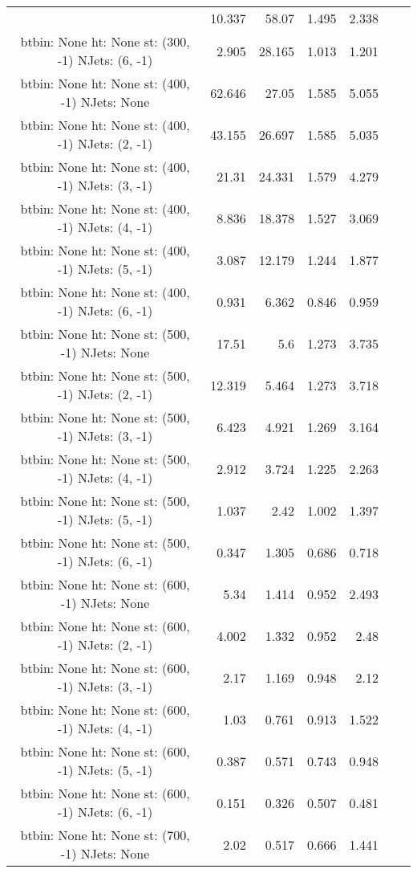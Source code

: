 \documentclass[12pt]{paper}
\begin{document}
\begin{landscape}
\begin{longtable}{c|r|r|r|r|r|r}
 & 10.337 & 58.07 & 1.495 & 2.338\\
btbin:  None ht:  None st:  (300, -1) NJets:  (6, -1)
 & 2.905 & 28.165 & 1.013 & 1.201\\
btbin:  None ht:  None st:  (400, -1) NJets:  None
 & 62.646 & 27.05 & 1.585 & 5.055\\
btbin:  None ht:  None st:  (400, -1) NJets:  (2, -1)
 & 43.155 & 26.697 & 1.585 & 5.035\\
btbin:  None ht:  None st:  (400, -1) NJets:  (3, -1)
 & 21.31 & 24.331 & 1.579 & 4.279\\
btbin:  None ht:  None st:  (400, -1) NJets:  (4, -1)
 & 8.836 & 18.378 & 1.527 & 3.069\\
btbin:  None ht:  None st:  (400, -1) NJets:  (5, -1)
 & 3.087 & 12.179 & 1.244 & 1.877\\
btbin:  None ht:  None st:  (400, -1) NJets:  (6, -1)
 & 0.931 & 6.362 & 0.846 & 0.959\\
btbin:  None ht:  None st:  (500, -1) NJets:  None
 & 17.51 & 5.6 & 1.273 & 3.735\\
btbin:  None ht:  None st:  (500, -1) NJets:  (2, -1)
 & 12.319 & 5.464 & 1.273 & 3.718\\
btbin:  None ht:  None st:  (500, -1) NJets:  (3, -1)
 & 6.423 & 4.921 & 1.269 & 3.164\\
btbin:  None ht:  None st:  (500, -1) NJets:  (4, -1)
 & 2.912 & 3.724 & 1.225 & 2.263\\
btbin:  None ht:  None st:  (500, -1) NJets:  (5, -1)
 & 1.037 & 2.42 & 1.002 & 1.397\\
btbin:  None ht:  None st:  (500, -1) NJets:  (6, -1)
 & 0.347 & 1.305 & 0.686 & 0.718\\
btbin:  None ht:  None st:  (600, -1) NJets:  None
 & 5.34 & 1.414 & 0.952 & 2.493\\
btbin:  None ht:  None st:  (600, -1) NJets:  (2, -1)
 & 4.002 & 1.332 & 0.952 & 2.48\\
btbin:  None ht:  None st:  (600, -1) NJets:  (3, -1)
 & 2.17 & 1.169 & 0.948 & 2.12\\
btbin:  None ht:  None st:  (600, -1) NJets:  (4, -1)
 & 1.03 & 0.761 & 0.913 & 1.522\\
btbin:  None ht:  None st:  (600, -1) NJets:  (5, -1)
 & 0.387 & 0.571 & 0.743 & 0.948\\
btbin:  None ht:  None st:  (600, -1) NJets:  (6, -1)
 & 0.151 & 0.326 & 0.507 & 0.481\\
btbin:  None ht:  None st:  (700, -1) NJets:  None
 & 2.02 & 0.517 & 0.666 & 1.441\\

\end{longtable}
\end{landscape}
\end{document}
